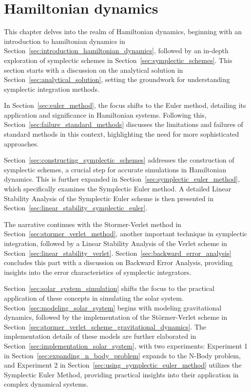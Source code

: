 \documentclass{report}
\begin{document}
\chapter{Hamiltonian dynamics}
\label{sec:hamiltonian_dynamics}

This chapter delves into the realm of Hamiltonian dynamics, beginning with an introduction to hamiltonian dynamics in Section~\ref{sec:introduction_hamiltonian_dynamics}, followed by an in-depth exploration of symplectic schemes in Section~\ref{sec:symplectic_schemes}. This section starts with a discussion on the analytical solution in Section~\ref{sec:analytical_solution}, setting the groundwork for understanding symplectic integration methods.

In Section~\ref{sec:euler_method}, the focus shifts to the Euler method, detailing its application and significance in Hamiltonian systems. Following this, Section~\ref{sec:failure_standard_methods} discusses the limitations and failures of standard methods in this context, highlighting the need for more sophisticated approaches.

Section~\ref{sec:constructing_symplectic_schemes} addresses the construction of symplectic schemes, a crucial step for accurate simulations in Hamiltonian dynamics. This is further expanded in Section~\ref{sec:symplectic_euler_method}, which specifically examines the Symplectic Euler method. A detailed Linear Stability Analysis of the Symplectic Euler scheme is then presented in Section~\ref{sec:linear_stability_symplectic_euler}.

The narrative continues with the Stormer-Verlet method in Section~\ref{sec:stormer_verlet_method}, another important technique in symplectic integration, followed by a Linear Stability Analysis of the Verlet scheme in Section~\ref{sec:linear_stability_verlet}. Section~\ref{sec:backward_error_analysis} concludes this part with a discussion on Backward Error Analysis, providing insights into the error characteristics of symplectic integrators.

Section~\ref{sec:solar_system_simulation} shifts the focus to the practical application of these concepts in simulating the solar system. Section~\ref{sec:modeling_solar_system} begins with modeling gravitational dynamics, followed by the implementation of the Störmer-Verlet scheme in Section~\ref{sec:stormer_verlet_scheme_gravitational_dynamics}. The implementation details of these models are further elaborated in Section~\ref{sec:implementation_solar_system}, with two experiments: Experiment 1 in Section~\ref{sec:expanding_n_body_problem} expands to the N-Body problem, and Experiment 2 in Section~\ref{sec:using_symplectic_euler_method} utilizes the Symplectic Euler Method, providing practical insights into their application in complex dynamical systems.
\end{document}
